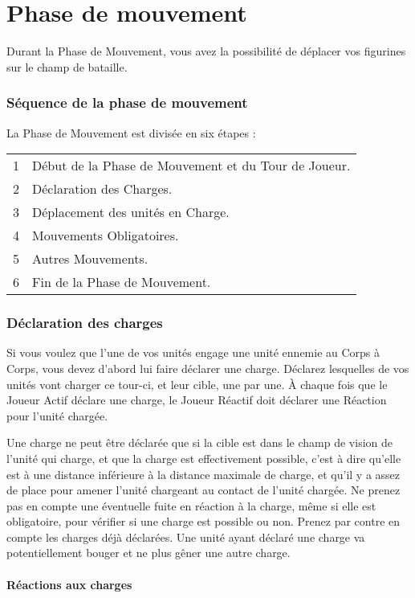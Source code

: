 
\part{Phase de mouvement}

Durant la Phase de Mouvement, vous avez la possibilité de déplacer vos figurines sur le champ de bataille.

\section{Séquence de la phase de mouvement}

La Phase de Mouvement est divisée en six étapes :

\hspace*{0.3cm}
\begin{tabular}{c|l}
1 & Début de la Phase de Mouvement et du Tour de Joueur. \tabularnewline
2 & Déclaration des Charges. \tabularnewline
3 & Déplacement des unités en Charge. \tabularnewline
4 & Mouvements Obligatoires. \tabularnewline
5 & Autres Mouvements. \tabularnewline
6 & Fin de la Phase de Mouvement. \tabularnewline
\end{tabular}


\section{Déclaration des charges}

Si vous voulez que l'une de vos unités engage une unité ennemie au Corps à Corps, vous devez d'abord lui faire déclarer une charge. Déclarez lesquelles de vos unités vont charger ce tour-ci, et leur cible, une par une. À chaque fois que le Joueur Actif déclare une charge, le Joueur Réactif doit déclarer une Réaction pour l'unité chargée.

Une charge ne peut être déclarée que si la cible est dans le champ de vision de l'unité qui charge, et que la charge est effectivement possible, c'est à dire qu'elle est à une distance inférieure à la distance maximale de charge, et qu'il y a assez de place pour amener l'unité chargeant au contact de l'unité chargée. Ne prenez pas en compte une éventuelle fuite en réaction à la charge, même si elle est obligatoire, pour vérifier si une charge est possible ou non. Prenez par contre en compte les charges déjà déclarées. Une unité ayant déclaré une charge va potentiellement bouger et ne plus gêner une autre charge.

\subsection{Réactions aux charges}

